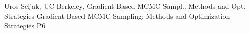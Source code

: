 {}	%
{}		%
{Uros Seljak, UC Berkeley, Gradient-Based MCMC Sampl.: Methods and Opt. Strategies}	%
{Gradient-Based MCMC Sampling: Methods and Optimization Strategies}		%
{P6}		%
\\\hline
